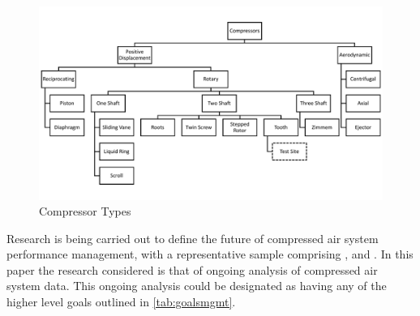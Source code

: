 \begin{figure}
\includegraphics[width = \textwidth]{./Images/CompressorClassification.pdf}
\caption{Compressor Types}
\label{fig:comptypes}
\end{figure}


Research is being carried out to define the future of compressed air system performance management, with a representative sample comprising \cite{DapengNiu2011}, \cite{Ren2012} and \cite{Kopanos2015}. In this paper the research considered is that of ongoing analysis of compressed air system data. This ongoing analysis could be designated as having any of the higher level goals outlined in \autoref{tab:goalsmgmt}.

